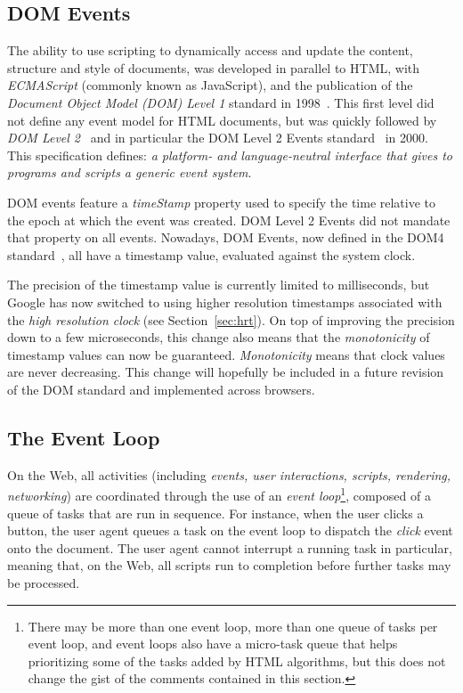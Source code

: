 \documentclass[graybox]{svmult}
\begin{document}
\subsection{DOM Events}
\label{sec:domevents}

The ability to use scripting to dynamically access and update the content,
structure and style of documents, was developed in parallel to HTML, with
\emph{ECMAScript} (commonly known as JavaScript), and the publication of the
\emph{Document Object Model (DOM) Level 1} standard in 1998~\cite{dom1}. This
first level did not define any event model for HTML documents, but was quickly
followed by \emph{DOM Level 2}~\cite{dom2} and in particular the DOM Level 2
Events standard~\cite{domevents} in 2000. This specification defines: \emph{a
platform- and language-neutral interface that gives to programs and scripts a
generic event system}.

DOM events feature a \emph{timeStamp} property used to specify the time relative to
the epoch at which the event was created. DOM Level 2 Events did not mandate
that property on all events. Nowadays, DOM Events, now defined in the DOM4
standard~\cite{dom4}, all have a timestamp value, evaluated against the system
clock.

The precision of the timestamp value is currently limited to milliseconds, but
Google has now switched to using higher resolution timestamps associated with
the \emph{high resolution clock} (see Section~\ref{sec:hrt}). On top of
improving the precision down to a few microseconds, this change also means
that the \emph{monotonicity} of timestamp values can now be guaranteed.
\emph{Monotonicity} means that clock values are never decreasing. This change
will hopefully be included in a future revision of the DOM standard and
implemented across browsers.



\subsection{The Event Loop}
\label{sec:eventloop}

On the Web, all activities (including \emph{events, user interactions,
scripts, rendering, networking}) are coordinated through the use of an
\emph{event loop}\footnote{There may be more than one event loop, more than
one queue of tasks per event loop, and event loops also have a micro-task
queue that helps prioritizing some of the tasks added by HTML algorithms, but
this does not change the gist of the comments contained in this section.},
composed of a queue of tasks that are run in sequence. For instance, when the
user clicks a button, the user agent queues a task on the event loop to
dispatch the \emph{click} event onto the document. The user agent cannot
interrupt a running task in particular, meaning that, on the Web, all scripts
run to completion before further tasks may be processed.
\end{document}
